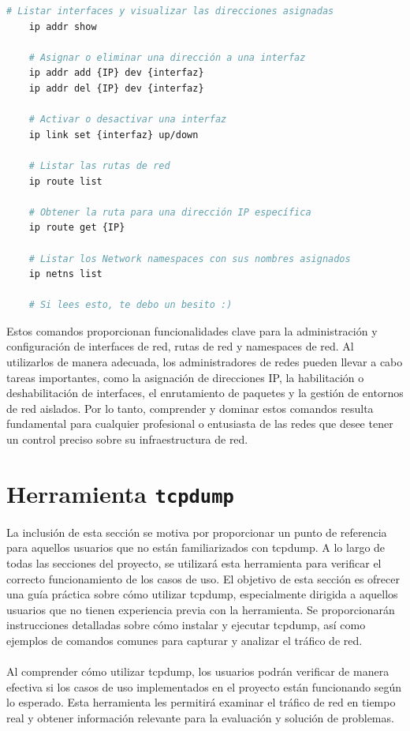\begin{lstlisting}[language= bash, style=Consola, caption={Comandos útiles con iproute2},label=code:iproute2_use]
    # Listar interfaces y visualizar las direcciones asignadas
    ip addr show
    
    # Asignar o eliminar una dirección a una interfaz
    ip addr add {IP} dev {interfaz}
    ip addr del {IP} dev {interfaz}
    
    # Activar o desactivar una interfaz
    ip link set {interfaz} up/down
    
    # Listar las rutas de red
    ip route list
    
    # Obtener la ruta para una dirección IP específica
    ip route get {IP}
    
    # Listar los Network namespaces con sus nombres asignados
    ip netns list
    
    # Si lees esto, te debo un besito :)
\end{lstlisting}
\vspace{0.5cm}
Estos comandos proporcionan funcionalidades clave para la administración y configuración de interfaces de red, rutas de red y namespaces de red. Al utilizarlos de manera adecuada, los administradores de redes pueden llevar a cabo tareas importantes, como la asignación de direcciones IP, la habilitación o deshabilitación de interfaces, el enrutamiento de paquetes y la gestión de entornos de red aislados. Por lo tanto, comprender y dominar estos comandos resulta fundamental para cualquier profesional o entusiasta de las redes que desee tener un control preciso sobre su infraestructura de red.
\newpage

\section{Herramienta \texttt{tcpdump}}
\label{tcpdump}

La inclusión de esta sección se motiva por proporcionar un punto de referencia para aquellos usuarios que no están familiarizados con tcpdump. A lo largo de todas las secciones del proyecto, se utilizará esta herramienta para verificar el correcto funcionamiento de los casos de uso. El objetivo de esta sección es ofrecer una guía práctica sobre cómo utilizar tcpdump, especialmente dirigida a aquellos usuarios que no tienen experiencia previa con la herramienta. Se proporcionarán instrucciones detalladas sobre cómo instalar y ejecutar tcpdump, así como ejemplos de comandos comunes para capturar y analizar el tráfico de red.\\
\\
Al comprender cómo utilizar tcpdump, los usuarios podrán verificar de manera efectiva si los casos de uso implementados en el proyecto están funcionando según lo esperado. Esta herramienta les permitirá examinar el tráfico de red en tiempo real y obtener información relevante para la evaluación y solución de problemas.

